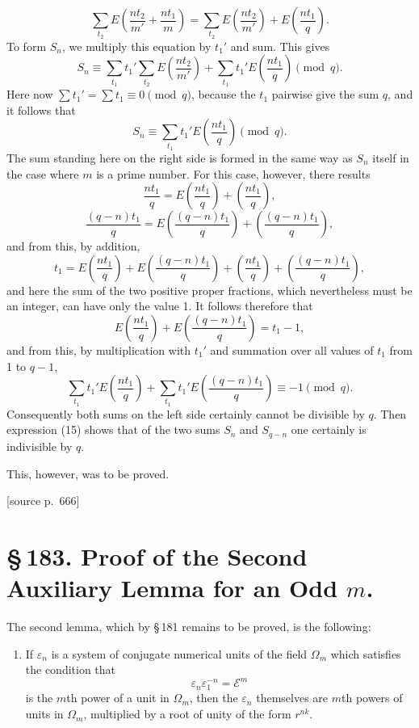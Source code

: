 \documentclass[11pt]{article}
\newcommand{\srcpage}[1]{\par\medskip\noindent\textsf{[source p.~#1]}\par\smallskip}
\begin{document}
\[
\sum_{t_2}E\left(\frac{nt_2}{m'}+\frac{nt_1}{m}\right)
=
\sum_{t_2}E\left(\frac{nt_2}{m'}\right)+E\left(\frac{nt_1}{q}\right).
\]
To form $S_n$, we multiply this equation by $t_1'$ and sum. This gives
\[
S_n\equiv \sum_{t_1}t_1'\sum_{t_2}E\left(\frac{nt_2}{m'}\right)+\sum_{t_1}t_1'E\left(\frac{nt_1}{q}\right)\pmod q.
\]
Here now $\sum t_1'=\sum t_1\equiv0\pmod q$, because the $t_1$ pairwise give the sum $q$, and it follows that
\begin{equation}
S_n\equiv\sum_{t_1}t_1'E\left(\frac{nt_1}{q}\right)\pmod q.
\tag{15}
\end{equation}
The sum standing here on the right side is formed in the same way as $S_n$ itself in the case where $m$ is a prime number. For this case, however, there results
\[
\frac{nt_1}{q}=E\left(\frac{nt_1}{q}\right)+\left(\frac{nt_1}{q}\right),
\]
\[
\frac{(q-n)t_1}{q}=E\left(\frac{(q-n)t_1}{q}\right)+\left(\frac{(q-n)t_1}{q}\right),
\]
and from this, by addition,
\[
t_1=E\left(\frac{nt_1}{q}\right)+E\left(\frac{(q-n)t_1}{q}\right)+\left(\frac{nt_1}{q}\right)+\left(\frac{(q-n)t_1}{q}\right),
\]
and here the sum of the two positive proper fractions, which nevertheless must be an integer, can have only the value 1. It follows therefore that
\[
E\left(\frac{nt_1}{q}\right)+E\left(\frac{(q-n)t_1}{q}\right)=t_1-1,
\]
and from this, by multiplication with $t_1'$ and summation over all values of $t_1$ from 1 to $q-1$,
\[
\sum_{t_1}t_1'E\left(\frac{nt_1}{q}\right)+\sum_{t_1}t_1'E\left(\frac{(q-n)t_1}{q}\right)\equiv -1\pmod q.
\]
Consequently both sums on the left side certainly cannot be divisible by $q$. Then expression (15) shows that of the two sums $S_n$ and $S_{q-n}$ one certainly is indivisible by $q$.

This, however, was to be proved.

\srcpage{666}
\section*{\S\,183. Proof of the Second Auxiliary Lemma for an Odd $m$.}

The second lemma, which by \S\,181 remains to be proved, is the following:

\begin{enumerate}[label=\arabic*.,leftmargin=2.2em,start=2]
\item If $\varepsilon_n$ is a system of conjugate numerical units of the field $\Omega_m$ which satisfies the condition that
\begin{equation}
\varepsilon_n\varepsilon_1^{-n}=\mathscr E^m
\tag{1}
\end{equation}
is the $m$th power of a unit in $\Omega_m$, then the $\varepsilon_n$ themselves are $m$th powers of units in $\Omega_m$, multiplied by a root of unity of the form $r^{nk}$.
\end{enumerate}
\end{document}

